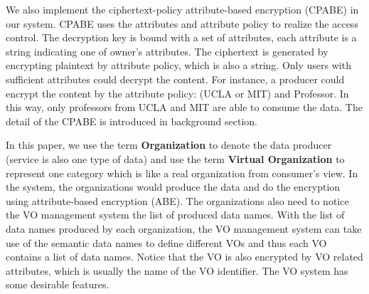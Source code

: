 We also implement the ciphertext-policy attribute-based encryption (CPABE) in our system.
CPABE uses the attributes and attribute policy to realize the access control.
The decryption key is bound with a set of attributes, each attribute is a string indicating one of owner's attributes.
The ciphertext is generated by encrypting plaintext by attribute policy, which is also a string.
Only users with sufficient attributes could decrypt the content.
For instance, a producer could encrypt the content by the attribute policy: (UCLA or MIT) and Professor.
In this way, only professors from UCLA and MIT are able to consume the data.
The detail of the CPABE is introduced in background section.

In this paper, we use the term \textbf{Organization} to denote the data producer (service is also one type of data) and use the term \textbf{Virtual Organization} to represent one category which is like a real organization from consumer's view.
In the system, the organizations would produce the data and do the encryption using attribute-based encryption (ABE).
The organizations also need to notice the VO management system the list of produced data names.
With the list of data names produced by each organization, the VO management system can take use of the semantic data names to define different VOs and thus each VO contains a list of data names.
Notice that the VO is also encrypted by VO related attributes, which is usually the name of the VO identifier.
The VO system has some desirable features.
